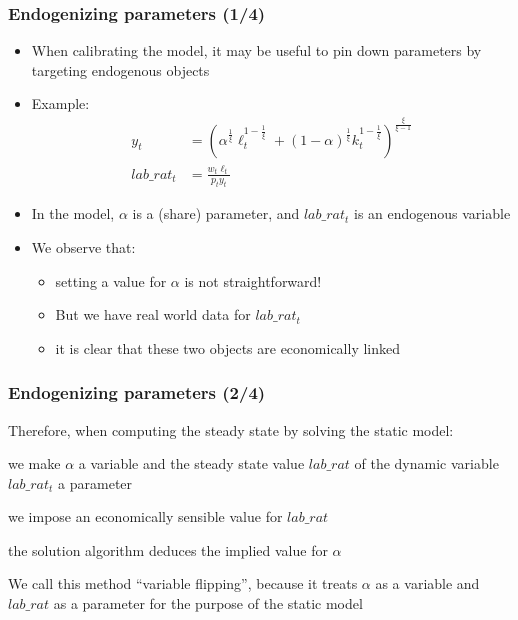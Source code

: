 \documentclass[handout,usepdftitle=false,xcolor=dvipsnames,aspectratio=169]{beamer}
\begin{document}
\begin{frame}
  \frametitle{Endogenizing parameters (1/4)}
  \begin{itemize}
    \item When calibrating the model, it may be useful to pin down parameters by targeting endogenous objects
    \item Example:
          \begin{align}
            y_t        & = \left(\alpha^{\frac{1}{\xi}} \ell_t^{1-\frac{1}{\xi}} + (1-\alpha)^{\frac{1}{\xi}}k_t^{1-\frac{1}{\xi}}\right)^{\frac{\xi}{\xi - 1}} \\
            lab\_rat_t & = \frac{w_t \ell_t}{p_t y_t}
          \end{align}
    \item In the model, $\alpha$ is a (share) parameter, and $lab\_rat_t$ is an endogenous variable
    \item We observe that:
          \begin{itemize}
            \item setting a value for $\alpha$ is not straightforward!
            \item But we have real world data for $lab\_rat_t$
            \item it is clear that these two objects are economically linked
          \end{itemize}
  \end{itemize}
\end{frame}

\begin{frame}[fragile]
  \frametitle{Endogenizing parameters (2/4)}
  \begin{witemize}
    \item Therefore, when computing the steady state by solving the static model:
    \begin{witemize}
      \item we make $\alpha$ a variable and the steady state value $lab\_rat$ of the dynamic variable $lab\_rat_t$ a parameter
      \item we impose an economically sensible value for $lab\_rat$
      \item the solution algorithm deduces the implied value for $\alpha$
    \end{witemize}
    \item We call this method ``variable flipping'', because it treats $\alpha$ as a variable and $lab\_rat$ as a parameter for the purpose of the static model
  \end{witemize}
\end{frame}
\end{document}
